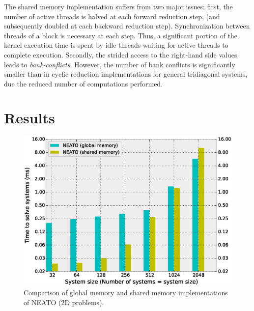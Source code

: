 \documentclass{elsarticle}
\begin{document}
The shared memory implementation suffers from two major issues:
first, the number of active threads is halved at each forward reduction step,
(and subsequently doubled at each backward reduction step).
Synchronization between threads of a block is necessary at each step.
Thus, a significant portion of the kernel execution time is
spent by idle threads waiting for active threads to complete execution.
Secondly, the strided access to the
right-hand side values leads to \emph{bank-conflicts}.
However, the number of bank conflicts is significantly smaller
than in cyclic reduction implementations for general tridiagonal systems,
due the reduced number of computations performed.

\section{Results} \label{sec:results-single-gpu}

\begin{figure}
\begin{center}
\includegraphics[width=1.0\linewidth]{fig/global-vs-shared-2d.eps}
\caption{Comparison of global memory and shared
    memory implementations of NEATO (2D problems).}
\label{fig:global-vs-shared-2d}
\end{center}
\end{figure}
\end{document}
